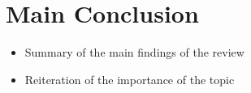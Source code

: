 \section{Main Conclusion}
\begin{itemize}
    \item Summary of the main findings of the review
    \item Reiteration of the importance of the topic
\end{itemize}